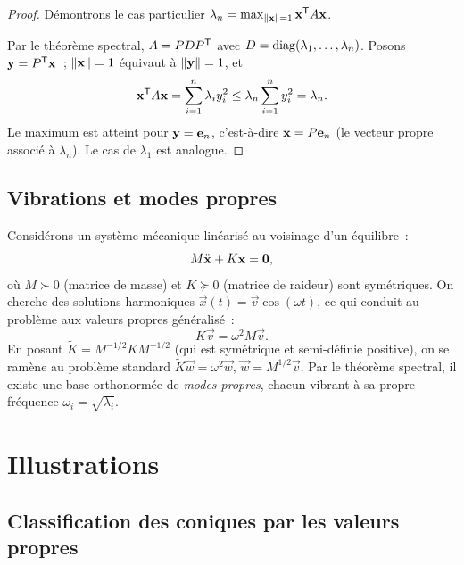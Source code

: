\begin{proof}
  Démontrons le cas particulier $\lambda_n = \max_{\lVert\mathbf{x}\rVert=1}
  {\mathbf{x}}^{\mathsf{T}} A \mathbf{x}$.

  Par le théorème spectral, $A = P D {P}^{\mathsf{T}}$ avec
  $D = \operatorname{diag}(\lambda_1, \ldots, \lambda_n)$. Posons $\mathbf{y} = {P}^{\mathsf{T}}\mathbf{x}$~;
  $\lVert\mathbf{x}\rVert = 1$ équivaut à $\lVert\mathbf{y}\rVert = 1$, et
  \[
    {\mathbf{x}}^{\mathsf{T}} A \mathbf{x}
    = \sum_{i=1}^{n} \lambda_i y_i^2
    \leq \lambda_n \sum_{i=1}^{n} y_i^2
    = \lambda_n.
  \]
  Le maximum est atteint pour $\mathbf{y} = \mathbf{e}_{n}$, c'est-à-dire
  $\mathbf{x} = P\mathbf{e}_{n}$ (le vecteur propre associé à $\lambda_n$).
  Le cas de $\lambda_1$ est analogue.
\end{proof}

\subsection{Vibrations et modes propres}\label{subsec:vibrations}

Considérons un système mécanique
linéarisé au voisinage d'un équilibre~:
\[
  M \ddot{\mathbf{x}} + K \mathbf{x} = \mathbf{0},
\]
où $M \succ 0$ (matrice de masse) et $K \succeq 0$ (matrice de raideur)
sont symétriques. On cherche des solutions harmoniques
$\vec{x}(t) = \vec{v} \cos(\omega t)$, ce qui conduit au problème aux
valeurs propres généralisé~:
\[
  K \vec{v} = \omega^2 M \vec{v}.
\]
En posant $\tilde{K} = M^{-1/2} K M^{-1/2}$ (qui est symétrique et
semi-définie positive), on se ramène au problème standard
$\tilde{K}\vec{w} = \omega^2 \vec{w}$, $\vec{w} = M^{1/2}\vec{v}$.
Par le théorème spectral, il existe une base orthonormée de
\emph{modes propres}, chacun vibrant à sa propre fréquence
$\omega_i = \sqrt{\lambda_i}$.

\section{Illustrations}\label{sec:spectral-tikz}

\subsection{Classification des coniques par les valeurs propres}

